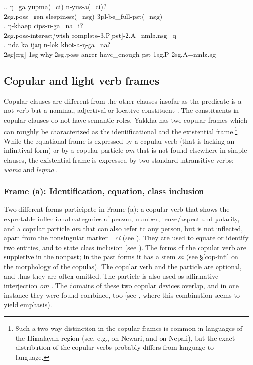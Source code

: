 \ex.\ag. ŋ=ga yupma(=ci) n-yus-a(=ci)?\\	
		{\sc 2sg.poss=gen} sleepiness{\sc (=nsg)} 	{\sc 3pl}-be\_full{\sc -pst(=nsg)}\\
		\bg. ŋ-khaep cips-u-ga=na=i?\\
	{\sc 2sg.poss-}interest/wish complete{\sc -3.P[pst]-2.A=nmlz.nsg=q}\\
	\bg. nda ka ijaŋ n-lok khot-a-ŋ-ga=na?\\
	{\sc 2sg[erg]} {\sc 1sg} why {\sc 2sg.poss}-anger have\_enough{\sc -pst-1sg.P-2sg.A=nmlz.sg}\\


\subsection{Copular and light verb frames}\label{cop}

Copular clauses are different from the other clauses insofar as the predicate is a not verb but a nominal, adjectival or locative constituent \citep[225]{Dryer2007Clause}. The constituents in copular clauses do not have semantic roles. Yakkha has two copular frames which can roughly be characterized as the identificational and the existential frame.\footnote{Such a two-way distinction in the copular frames is common in languages of the Himalayan region (see, e.g., \citet{Genetti2007_Newari} on Newari, and \citet{Matthews1984Course} on Nepali), but the exact distribution of the copular verbs probably differs from language to language.} While the equational frame is expressed by a copular verb (that is lacking an infinitival form) or by a copular particle \emph{om} that is not found elsewhere in simple clauses, the existential frame is expressed by two standard intransitive verbs: \emph{wama}  and \emph{leŋma} . 

\subsubsection{Frame (a): Identification, equation,  class inclusion}

Two different forms participate in Frame (a): a copular verb that shows the expectable inflectional categories of person, number, tense/aspect and polarity, and a copular particle \emph{om} that can also refer to any person, but is not inflected, apart from the nonsingular marker \emph{=ci} (see \Next[c]). They are used to equate or identify two entities, and to state class inclusion (see \Next).  The forms of the copular verb are suppletive in the nonpast; in the past forms it has a stem \emph{sa} (see §\ref{cop-infl} on the morphology of the copulas). The copular verb and the particle are optional, and thus they are often omitted. The particle is also used as affirmative interjection \emph{om} .  The domains of these two copular devices overlap, and in one instance they were found combined, too (see \Next[d], where this combination seems to yield emphasis).
 
